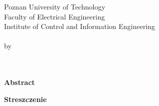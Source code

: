 \newpage
\thispagestyle{empty}
\begin{center}
Poznan University of Technology\\
Faculty of Electrical Engineering\\
Institute of Control and Information Engineering\\
  \vspace{10mm}
\huge{\TytulAngielski} \\
\large{by}\\
\large{\StudentA}\\
\large{\StudentB}\\
  \vspace{10mm}

\normalsize\textbf{Abstract} \\
{} 

\end{center}

\begin{center}
 \textbf{Streszczenie} \\
 {} 
\end{center}

 
